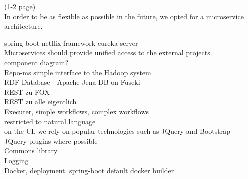 (1-2 page)\\
In order to be as flexible as possible in the future, we opted for a microservice architecture. 

spring-boot netflix framework eureka server\\
Microservices should provide unified access to the external projects.\\
component diagram?\\
Repo-ms simple interface to the Hadoop system\\
RDF Database - Apache Jena DB on Fuseki\\
REST zu FOX\\
REST zu alle eigentlich\\
Executer, simple workflows, complex workflows\\
restricted to natural language\\
on the UI, we rely on popular technologies such as JQuery and Bootstrap\\
JQuery plugins where possible\\
Commons library\\
Logging\\
Docker, deployment. spring-boot default docker builder\\